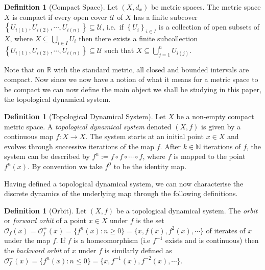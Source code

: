 \documentclass[11pt,a4paper,oneside]{memoir}
\theoremstyle{plain}
\theoremstyle{definition}
\newtheorem{defn}[thm]{Definition}
\begin{document}
\begin{defn}[Compact  Space] \label{defn:compact}
    Let $(X, d_x)$ be metric spaces. The metric space $X$ is compact if every open cover $\mathcal{U}$ of $X$ has a finite subcover $\left\lbrace U_{i(1)}, U_{i(2)}, \cdots, U_{i(n)} \right\rbrace \subseteq \mathcal{U}$, i.e.\ if $\left\lbrace U_i \right\rbrace_{i\in I}$ is a collection of open subsets of $X$, where $X \subseteq \bigcup_{i \in I}U_i$ then there exists a finite subcollection $\left\lbrace U_{i(1)}, U_{i(2)}, \cdots, U_{i(n)} \right\rbrace \subseteq \mathcal{U}$ such that $X \subseteq \bigcup_{j = 1}^{n}U_{i(j)}$.
\end{defn}

Note that on $\mathbb{R}$ with the standard metric, all closed and bounded intervals are compact. Now since we now have a notion of what it means for a metric space to be compact we can now define the main object we shall be studying in this paper, the topological dynamical system.

\begin{defn}[Topological Dynamical System] \label{defn:topological-dynamical-system}
    Let $X$ be a non-empty compact metric space. A \emph{topological dynamical system} denoted $(X, f)$ is given by a continuous map $f: X \to X$. The system starts at an initial point $x \in X$ and evolves through successive iterations of the map $f$. After $k \in \mathbb{N}$ iterations of $f$, the system can be described by $f^n := f \circ f \circ \cdots \circ f$, where $f$ is mapped to the point $f^n(x)$. By convention we take $f^0$ to be the identity map.
\end{defn}

Having defined a topological dynamical system, we can now characterise the discrete dynamics of the underlying map through the following definitions.

\begin{defn}[Orbit] \label{defn:orbit}
    Let $(X, f)$ be a topological dynamical system. The \emph{orbit} or \emph{forward orbit} of a point $x \in X$ under $f$ is the set $\mathcal{O}_f(x) = \mathcal{O}^+_f(x) = \lbrace f^n(x) : n \geq 0 \rbrace = \lbrace x, f(x), f^2(x), \cdots \rbrace$ of iterates of $x$ under the map $f$. If $f$ is a homeomorphism (i.e $f^{-1}$ exists and is continuous) then the \emph{backward orbit} of $x$ under $f$ is similarly defined as $\mathcal{O}^-_f(x) = \lbrace f^n(x) : n \leq 0 \rbrace = \lbrace x, f^{-1}(x), f^{-2}(x), \cdots \rbrace$.
\end{defn}
\end{document}
